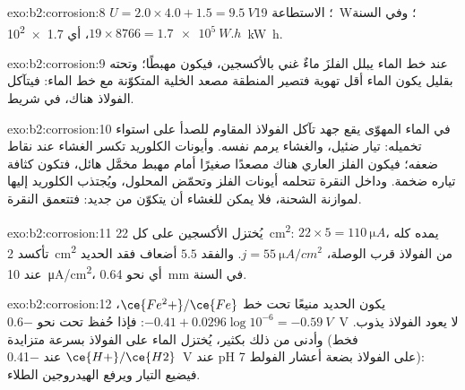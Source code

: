\begin{solution}{exo:b2:corrosion:8}
$U = 2.0 \times 4.0 + 1.5 = \qty{9.5}{V}$؛ الاستطاعة \qty{19}{W}؛ وفي السنة $19 \times
8766 = \qty{1.7e5}{W.h}$، أي \qty{1.7e2}{kW.h}.
\end{solution}

\begin{solution}{exo:b2:corrosion:9}
عند خط الماء يبلل الفلزَ ماءٌ غني بالأكسجين، فيكون مهبطًا؛ وتحته
بقليل يكون الماء أقل تهوية فتصير المنطقة مصعد الخلية
المتكوّنة مع خط الماء: فيتآكل الفولاذ هناك، في شريط.
\end{solution}

\begin{solution}{exo:b2:corrosion:10}
في الماء المهوّى يقع جهد تآكل الفولاذ المقاوم للصدأ على استواء
تخميله: تيار ضئيل، والغشاء يرمم نفسه. وأيونات الكلوريد تكسر
الغشاء عند نقاط ضعفه؛ فيكون الفلز العاري هناك مصعدًا صغيرًا أمام
مهبط مخمَّل هائل، فتكون كثافة تياره ضخمة. وداخل النقرة
تتحلمه أيونات الفلز وتحمّض المحلول، ويُجتذب الكلوريد إليها لموازنة
الشحنة، فلا يمكن للغشاء أن يتكوّن من جديد: فتتعمق النقرة.
\end{solution}

\begin{solution}{exo:b2:corrosion:11}
يُختزل الأكسجين على كل \qty{22}{cm^2}:  $22 \times 5 =
\qty{110}{\micro A}$، يمده كله تأكسد \qty{2}{cm^2} من الفولاذ
قرب الوصلة، $j = \qty{55}{\micro A/cm^2}$. والفقد $5.5$ أضعاف فقد الحديد
عند \qty{10}{\micro A/cm^2}، أي نحو \qty{0.64}{mm} في السنة.
\end{solution}

\begin{solution}{exo:b2:corrosion:12}
يكون الحديد منيعًا تحت خط $\ce{Fe^2+}/\ce{Fe}$، $-0.41 + 0.0296\log 10^{-6} =
\qty{-0.59}{V}$: فإذا حُفظ تحت نحو \qty{-0.6}{V} لا يعود الفولاذ يذوب. وأدنى من ذلك
بكثير، يُختزل الماء على الفولاذ بسرعة متزايدة (فخط $\ce{H+}/\ce{H2}$ عند
\qty{-0.41}{V} عند pH 7  على الفولاذ بضعة أعشار الفولط):
فيضيع التيار ويرفع الهيدروجين الطلاء.
\end{solution}

